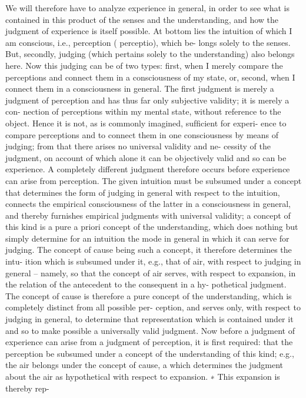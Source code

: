 We will therefore have to analyze experience in general, in order to see
what is contained in this product of the senses and the understanding,
and how the judgment of experience is itself possible. At bottom lies the
intuition of which I am conscious, i.e., perception ( perceptio), which be-
longs solely to the senses. But, secondly, judging (which pertains solely
to the understanding) also belongs here. Now this judging can be of two
types: ﬁrst, when I merely compare the perceptions and connect them
in a consciousness of my state, or, second, when I connect them in a
consciousness in general. The ﬁrst judgment is merely a judgment of
perception and has thus far only subjective validity; it is merely a con-
nection of perceptions within my mental state, without reference to the
object. Hence it is not, as is commonly imagined, sufﬁcient for experi-
ence to compare perceptions and to connect them in one consciousness
by means of judging; from that there arises no universal validity and ne-
cessity of the judgment, on account of which alone it can be objectively
valid and so can be experience.
A completely different judgment therefore occurs before experience
can arise from perception. The given intuition must be subsumed under
a concept that determines the form of judging in general with respect
to the intuition, connects the empirical consciousness of the latter in
a consciousness in general, and thereby furnishes empirical judgments
with universal validity; a concept of this kind is a pure a priori concept
of the understanding, which does nothing but simply determine for an
intuition the mode in general in which it can serve for judging. The
concept of cause being such a concept, it therefore determines the intu-
ition which is subsumed under it, e.g., that of air, with respect to judging
in general – namely, so that the concept of air serves, with respect to
expansion, in the relation of the antecedent to the consequent in a hy-
pothetical judgment. The concept of cause is therefore a pure concept
of the understanding, which is completely distinct from all possible per-
ception, and serves only, with respect to judging in general, to determine
that representation which is contained under it and so to make possible
a universally valid judgment.
Now before a judgment of experience can arise from a judgment of
perception, it is ﬁrst required: that the perception be subsumed under
a concept of the understanding of this kind; e.g., the air belongs under
the concept of cause, a which determines the judgment about the air as
hypothetical with respect to expansion. ∗ This expansion is thereby rep-
